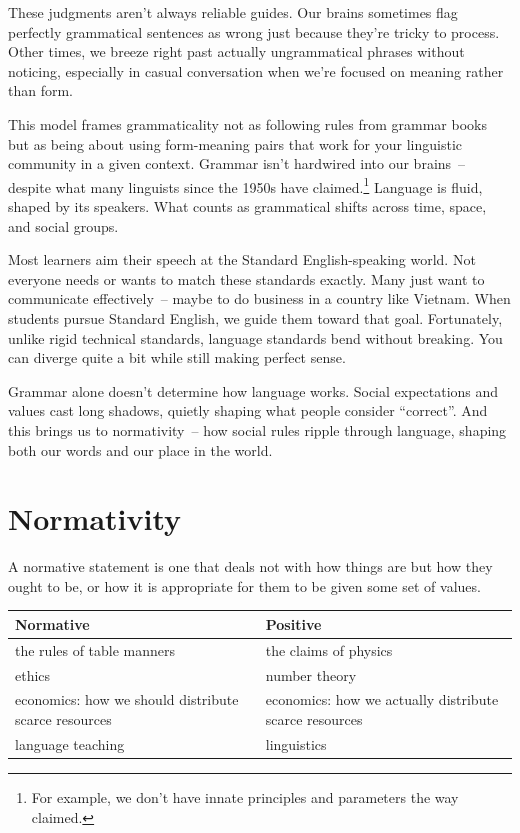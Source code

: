 These judgments aren't always reliable guides. Our brains sometimes flag perfectly grammatical sentences as wrong just because they're tricky to process. Other times, we breeze right past actually ungrammatical phrases without noticing, especially in casual conversation when we're focused on meaning rather than form.

This model frames grammaticality not as following rules from grammar books but as being about using form-meaning pairs that work for your linguistic community in a given context. Grammar isn't hardwired into our brains~-- despite what many linguists since the 1950s have claimed.\footnote{For example, we don't have innate principles and parameters the way \citet{chomsky1981lectures} claimed.} Language is fluid, shaped by its speakers. What counts as grammatical shifts across time, space, and social groups.

Most learners aim their speech at the Standard English-speaking world. Not everyone needs or wants to match these standards exactly. Many just want to communicate effectively~-- maybe to do business in a country like Vietnam. When students pursue Standard English, we guide them toward that goal. Fortunately, unlike rigid technical standards, language standards bend without breaking. You can diverge quite a bit while still making perfect sense.

Grammar alone doesn't determine how language works. Social expectations and values cast long shadows, quietly shaping what people consider ``correct''. And this brings us to normativity~-- how social rules ripple through language, shaping both our words and our place in the world.

\section{Normativity}\label{sec:normativity}

A normative statement is one that deals not with how things are but how they ought to be, or how it is appropriate for them to be given some set of values.

\begin{table}[ht]
    \centering
        \begin{tabularx}{\textwidth}{|X|X|}
            \hline
            \textbf{Normative} & \textbf{Positive} \\
            \hline
            the rules of table manners & the claims of physics \\
            ethics & number theory \\
            economics: how we should distribute scarce resources & economics: how we actually distribute scarce resources \\
            language teaching & linguistics \\
            \hline
        \end{tabularx}
\end{table}

